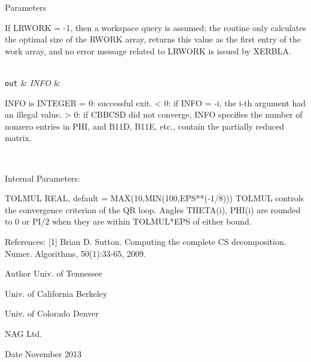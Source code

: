 \begin{DoxyParams}[1]{Parameters}
\begin{DoxyVerb}
          If LRWORK = -1, then a workspace query is assumed; the
          routine only calculates the optimal size of the RWORK array,
          returns this value as the first entry of the work array, and
          no error message related to LRWORK is issued by XERBLA.\end{DoxyVerb}
\\
\hline
\mbox{\tt out}  & {\em I\+N\+F\+O} & \begin{DoxyVerb}          INFO is INTEGER
          = 0:  successful exit.
          < 0:  if INFO = -i, the i-th argument had an illegal value.
          > 0:  if CBBCSD did not converge, INFO specifies the number
                of nonzero entries in PHI, and B11D, B11E, etc.,
                contain the partially reduced matrix.\end{DoxyVerb}
 \\
\hline
\end{DoxyParams}
\begin{DoxyParagraph}{Internal Parameters\+: }
\begin{DoxyVerb}  TOLMUL  REAL, default = MAX(10,MIN(100,EPS**(-1/8)))
          TOLMUL controls the convergence criterion of the QR loop.
          Angles THETA(i), PHI(i) are rounded to 0 or PI/2 when they
          are within TOLMUL*EPS of either bound.\end{DoxyVerb}
 
\end{DoxyParagraph}
\begin{DoxyParagraph}{References\+: }
\mbox{[}1\mbox{]} Brian D. Sutton. Computing the complete C\+S decomposition. Numer. Algorithms, 50(1)\+:33-\/65, 2009. 
\end{DoxyParagraph}
\begin{DoxyAuthor}{Author}
Univ. of Tennessee 

Univ. of California Berkeley 

Univ. of Colorado Denver 

N\+A\+G Ltd. 
\end{DoxyAuthor}
\begin{DoxyDate}{Date}
November 2013 
\end{DoxyDate}
